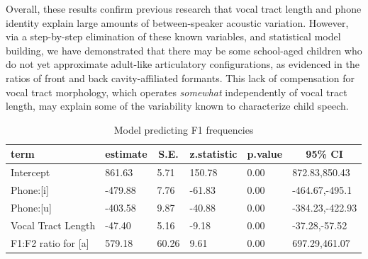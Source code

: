 \documentclass[
]{article}
\begin{document}
Overall, these results confirm previous research that vocal tract length and phone identity explain large amounts of between-speaker acoustic variation. However, via a step-by-step elimination of these known variables, and statistical model building, we have demonstrated that there may be some school-aged children who do not yet approximate adult-like articulatory configurations, as evidenced in the ratios of front and back cavity-affiliated formants. This lack of compensation for vocal tract morphology, which operates \emph{somewhat} independently of vocal tract length, may explain some of the variability known to characterize child speech.

\begin{table}[tbp]

\begin{center}
\begin{threeparttable}

\caption{\label{tab:f1-model}Model predicting F1 frequencies}

\begin{tabular}{llllll}
\toprule
term & \multicolumn{1}{c}{estimate} & \multicolumn{1}{c}{S.E.} & \multicolumn{1}{c}{z.statistic} & \multicolumn{1}{c}{p.value} & \multicolumn{1}{c}{95\% CI}\\
\midrule
Intercept & 861.63 & 5.71 & 150.78 & 0.00 & 872.83,850.43\\
Phone:[i] & -479.88 & 7.76 & -61.83 & 0.00 & -464.67,-495.1\\
Phone:[u] & -403.58 & 9.87 & -40.88 & 0.00 & -384.23,-422.93\\
Vocal Tract Length & -47.40 & 5.16 & -9.18 & 0.00 & -37.28,-57.52\\
F1:F2 ratio for [a] & 579.18 & 60.26 & 9.61 & 0.00 & 697.29,461.07\\
\bottomrule
\end{tabular}

\end{threeparttable}
\end{center}

\end{table}
\end{document}
